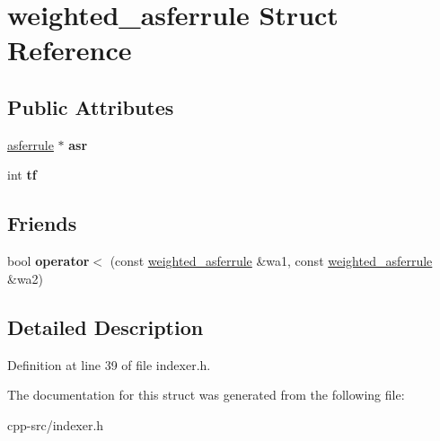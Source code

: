 \hypertarget{structweighted__asferrule}{\section{weighted\-\_\-asferrule Struct Reference}
\label{structweighted__asferrule}
}
\subsection*{Public Attributes}
\begin{DoxyCompactItemize}
\item 
\hypertarget{structweighted__asferrule_a9e4fdf89cc7c538466f7d9dc5929c03a}{\hyperlink{classasferrule}{asferrule} $\ast$ {\bfseries asr}}\label{structweighted__asferrule_a9e4fdf89cc7c538466f7d9dc5929c03a}

\item 
\hypertarget{structweighted__asferrule_ab7403141d04de93bd5a8cf62876f2c3f}{int {\bfseries tf}}\label{structweighted__asferrule_ab7403141d04de93bd5a8cf62876f2c3f}

\end{DoxyCompactItemize}
\subsection*{Friends}
\begin{DoxyCompactItemize}
\item 
\hypertarget{structweighted__asferrule_aa4cb9b860e3b5ea24a5133bb8a93af35}{bool {\bfseries operator$<$} (const \hyperlink{structweighted__asferrule}{weighted\-\_\-asferrule} \&wa1, const \hyperlink{structweighted__asferrule}{weighted\-\_\-asferrule} \&wa2)}\label{structweighted__asferrule_aa4cb9b860e3b5ea24a5133bb8a93af35}

\end{DoxyCompactItemize}


\subsection{Detailed Description}


Definition at line 39 of file indexer.\-h.



The documentation for this struct was generated from the following file\-:\begin{DoxyCompactItemize}
\item 
cpp-\/src/indexer.\-h\end{DoxyCompactItemize}

